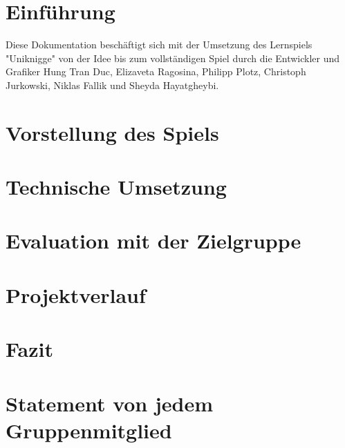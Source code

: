 \documentclass[a4paper, 11pt]{article} %
\begin{document}
\newpage
\renewcommand{\contentsname}{Inhaltsverzeichnis}
\tableofcontents

\newpage
\section{Einführung}
Diese Dokumentation beschäftigt sich mit der Umsetzung des Lernspiels "Uniknigge" von der Idee bis zum vollständigen Spiel durch die Entwickler und Grafiker Hung Tran Duc, Elizaveta Ragosina, Philipp Plotz, Christoph Jurkowski, Niklas Fallik und Sheyda Hayatgheybi.

\section{Vorstellung des Spiels}

\section{Technische Umsetzung}

\section{Evaluation mit der Zielgruppe}

\section{Projektverlauf}

\section{Fazit}

\section{Statement von jedem Gruppenmitglied}

\end{document}
